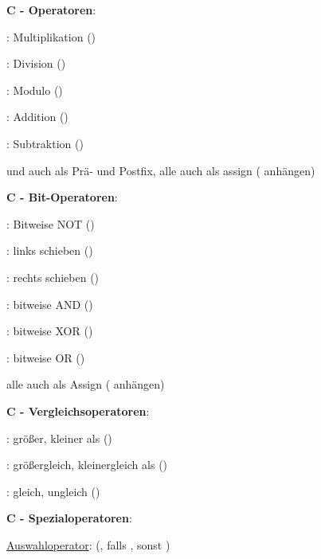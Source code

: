 \textbf{C - Operatoren}:
\begin{items}
  \item \underline{\code{*}}: Multiplikation ()
  \item \underline{\code{/}}: Division ()
  \item \underline{\code{\%}}: Modulo ()
  \item \underline{\code{+}}: Addition ()
  \item \underline{\code{-}}: Subtraktion ()
  \item \code{+} und \code{-} auch als Prä- und Postfix, alle auch als assign (\code{=} anhängen)
\end{items}

\textbf{C - Bit-Operatoren}:
\begin{items}
  \item \underline{\code{\~}}: Bitweise NOT ()
  \item \underline{\code{<<}}: links schieben ()
  \item \underline{\code{>>}}: rechts schieben ()
  \item \underline{\code{&}}: bitweise AND ()
  \item \underline{\code{^}}: bitweise XOR ()
  \item \underline{\code{|}}: bitweise OR ()
  \item alle auch als Assign (\code{=} anhängen)
\end{items}

\textbf{C - Vergleichsoperatoren}:
\begin{items}
  \item \underline{\code{>,<}}: größer, kleiner als ()
  \item \underline{\code{>=,<=}}: größergleich, kleinergleich als ()
  \item \underline{\code{==,!=}}: gleich, ungleich ()
\end{items}

\textbf{C - Spezialoperatoren}:
\begin{items}
  \item \underline{Auswahloperator}:  (, falls , sonst )
\end{items}